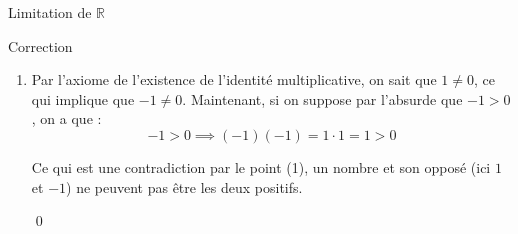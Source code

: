 \documentclass{article}
\begin{document}
\begin{parag}{Limitation de $\mathbb{R}$}
\begin{subparag}{Correction}
\begin{enumerate}[left=0pt]
          De la même manière,
          \[0 = 0\left(-x\right) = \left(x + \left(-x\right)\right)\left(-x\right) = x\left(-x\right) + \left(-x\right)\left(-x\right)=0 \]

          Qui implique que:
          \[-\left(\left(-x\right)\left(-x\right)\right) = x\left(-x\right) = \left(-x\right)x\]

          Puisqu'on obtiens deux résultats égaux ($\left(-x\right)x = \left(-x\right)x$), on sait donc que
          \[-\left(x\cdot x\right) = -\left(\left(-x\right)\left(-x\right)\right) \implies x\cdot x = \left(-x\right)\left(-x\right)\]

          Ensuite, par un des axiomes de la relation d'ordre de $\mathbb{R}$, on sait que
          \[x \geq 0 \implies \underbrace{x\cdot x}_{= \left(-x\right)\left(-x\right)} \geq 0 \]

          Et, de manière similaire:
          \[x \leq 0 \over{\implies}{(1)} \left(-x\right) \geq 0 \implies \underbrace{\left(-x\right)\left(-x\right)}_{= x\cdot x} \geq 0\]

          \item Par l'axiome de l'existence de l'identité multiplicative, on sait que $1 \neq 0$, ce qui implique que $-1 \neq 0$. Maintenant, si on suppose par l'absurde que $-1 > 0$, on a que :
              \[-1 > 0 \implies \left(-1\right)\left(-1\right) = 1\cdot 1= 1 > 0\]

              Ce qui est une contradiction par le point (1), un nombre et son opposé (ici $1$ et $-1$) ne peuvent pas être les deux positifs.

              \qed
        \end{enumerate}
    \end{subparag}
\end{parag}
\end{document}

